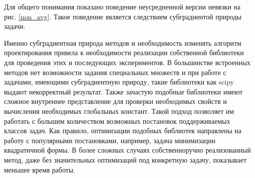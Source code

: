Для общего понимания показано поведение неусредненной версии невязки на рис. \ref{non_avg}. Такое поведение является следствием субградиентой природы задачи. 

Именно субградиентная природа методов и необходимость изменять алгоритм проектирования привела к необходимости реализации собственной библиотеки для проведения этих и последующих экспериментов. В большинстве встроенных методов нет возможности задания специальных  множеств и при работе с задачами, имеющими субградиентную природу, такие библиотеки как scipy выдают некорректный результат. Также зачастую подобные библиотеки имеют сложное внутреннее представление для проверки необходимых свойств и вычисления необходимых глобальных констант. Такой подход позволяет им работать с большим количеством возможных постановок поддерживаемых классов задач. Как правило, оптимизации подобных библиотек направлены на работу с популярными постановками, например, задача минимизации квадратичной формы. В более сложных случаях собственноручно реализованный метод, даже без значительных оптимизаций под конкретную задачу, показывает меньшее время работы. 

\FloatBarrier